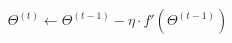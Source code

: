 \documentclass[preview]{standalone}
\begin{document}
\begin{align*}
\quad \Theta^{(t)} \gets \Theta^{(t-1)} - \eta \cdot f'(\Theta^{(t-1)})
\end{align*}
\end{document}

